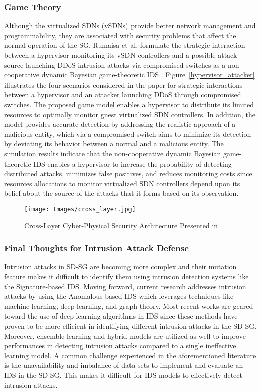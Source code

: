 \documentclass[conference]{IEEEtran}
\begin{document}
\subsubsection{Game Theory}
Although the virtualized SDNs (vSDNs) provide better network management and programmability, they are associated with security problems that affect the normal operation of the SG. Rumaisa et al. formulate the strategic interaction between a hypervisor monitoring its vSDN controllers and a possible attack source launching DDoS intrusion attacks via compromised switches as a non-cooperative dynamic Bayesian game-theoretic IDS \cite{8746112}. Figure~\ref{hypervisor_attacker} illustrates the four scenarios considered in the paper for strategic interactions between a hypervisor and an attacker launching DDoS through compromised switches. The proposed game model enables a hypervisor to distribute its limited resources to optimally monitor guest virtualized SDN controllers. In addition, the model provides accurate detection by addressing the realistic approach of a malicious entity, which via a compromised switch aims to minimize its detection by deviating its behavior between a normal and a malicious entity. The simulation results indicate that the non-cooperative dynamic Bayesian game-theoretic IDS enables a hypervisor to increase the probability of detecting distributed attacks, minimizes false positives, and reduces monitoring costs since resources allocations to monitor virtualized SDN controllers depend upon its belief about the source of the attacks that it forms based on its observation. 
\begin{figure*}[!t]
\centering
\texttt{[image: Images/cross\_layer.jpg]}
\caption{Cross-Layer Cyber-Physical Security Architecture Presented in \cite{starke2022cross}  }
\label{fig:Cross-Layer Cyber-Physica}
\end{figure*}


\subsubsection{Final Thoughts for Intrusion Attack Defense}
Intrusion attacks in SD-SG are becoming more complex and their mutation feature makes it difficult to identify them using intrusion detection systems like the Signature-based IDS. Moving forward, current research addresses intrusion attacks by using the Anomalous-based IDS which leverages techniques like machine learning, deep learning, and graph theory. Most recent works are geared toward the use of deep learning algorithms in IDS since these methods have proven to be more efficient in identifying different intrusion attacks in the SD-SG. Moreover, ensemble learning and hybrid models are utilized as well to improve performances in detecting intrusion attacks compared to a single ineffective learning model. A common challenge experienced in the aforementioned literature is the unavailability and imbalance of data sets to implement and evaluate an IDS in the SD-SG. This makes it difficult for IDS models to effectively detect intrusion attacks.
\end{document}
